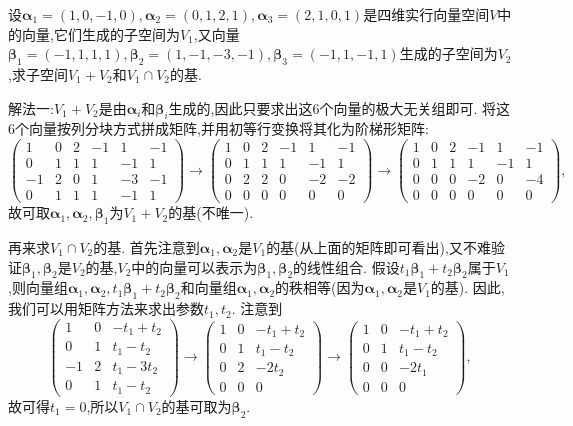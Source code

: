 \documentclass[lang=cn,newtx,10pt,scheme=chinese]{elegantbook}
\begin{document}
\begin{exercise}
设\(\boldsymbol{\alpha}_1=(1,0, - 1,0),\boldsymbol{\alpha}_2=(0,1,2,1),\boldsymbol{\alpha}_3=(2,1,0,1)\)是四维实行向量空间\(V\)中的向量,它们生成的子空间为\(V_1\),又向量\(\boldsymbol{\beta}_1=(-1,1,1,1),\boldsymbol{\beta}_2=(1,-1,-3,-1),\boldsymbol{\beta}_3=(-1,1,-1,1)\)生成的子空间为\(V_2\),求子空间\(V_1 + V_2\)和\(V_1\cap V_2\)的基.
\end{exercise}
\begin{solution}
{\color{blue}解法一:}\(V_1 + V_2\)是由\(\boldsymbol{\alpha}_i\)和\(\boldsymbol{\beta}_i\)生成的,因此只要求出这6个向量的极大无关组即可. 将这6个向量按列分块方式拼成矩阵,并用初等行变换将其化为阶梯形矩阵:
\[
\begin{pmatrix}
1&0&2&-1&1&-1\\
0&1&1&1&-1&1\\
-1&2&0&1&-3&-1\\
0&1&1&1&-1&1
\end{pmatrix}\to
\begin{pmatrix}
1&0&2&-1&1&-1\\
0&1&1&1&-1&1\\
0&2&2&0&-2&-2\\
0&0&0&0&0&0
\end{pmatrix}\to
\begin{pmatrix}
1&0&2&-1&1&-1\\
0&1&1&1&-1&1\\
0&0&0&-2&0&-4\\
0&0&0&0&0&0
\end{pmatrix},
\]
故可取\(\boldsymbol{\alpha}_1,\boldsymbol{\alpha}_2,\boldsymbol{\beta}_1\)为\(V_1 + V_2\)的基(不唯一).

再来求\(V_1\cap V_2\)的基. 首先注意到\(\boldsymbol{\alpha}_1,\boldsymbol{\alpha}_2\)是\(V_1\)的基(从上面的矩阵即可看出),又不难验证\(\boldsymbol{\beta}_1,\boldsymbol{\beta}_2\)是\(V_2\)的基,\(V_2\)中的向量可以表示为\(\boldsymbol{\beta}_1,\boldsymbol{\beta}_2\)的线性组合. 假设\(t_1\boldsymbol{\beta}_1 + t_2\boldsymbol{\beta}_2\)属于\(V_1\),则向量组\(\boldsymbol{\alpha}_1,\boldsymbol{\alpha}_2,t_1\boldsymbol{\beta}_1 + t_2\boldsymbol{\beta}_2\)和向量组\(\boldsymbol{\alpha}_1,\boldsymbol{\alpha}_2\)的秩相等(因为\(\boldsymbol{\alpha}_1,\boldsymbol{\alpha}_2\)是\(V_1\)的基). 因此,我们可以用矩阵方法来求出参数\(t_1,t_2\). 注意到
\[
\begin{pmatrix}
1&0&-t_1 + t_2\\
0&1&t_1 - t_2\\
-1&2&t_1 - 3t_2\\
0&1&t_1 - t_2
\end{pmatrix}\to
\begin{pmatrix}
1&0&-t_1 + t_2\\
0&1&t_1 - t_2\\
0&2&-2t_2\\
0&0&0
\end{pmatrix}\to
\begin{pmatrix}
1&0&-t_1 + t_2\\
0&1&t_1 - t_2\\
0&0&-2t_1\\
0&0&0
\end{pmatrix},
\]
故可得\(t_1 = 0\),所以\(V_1\cap V_2\)的基可取为\(\boldsymbol{\beta}_2\).


\end{solution}
\end{document}
